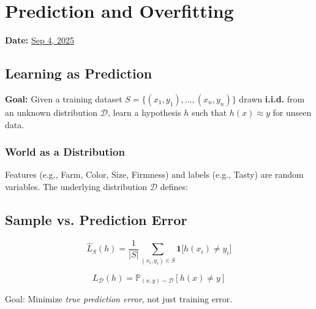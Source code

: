 \section{Prediction and Overfitting}
\textbf{Date:} \underline{Sep 4, 2025}

\subsection*{Learning as Prediction}

\textbf{Goal:}  
Given a training dataset $S = \{(x_1, y_1), \dots, (x_n, y_n)\}$ drawn \textbf{i.i.d.} from an unknown distribution $\mathcal{D}$,  
learn a hypothesis $h$ such that $h(x) \approx y$ for unseen data.

\subsubsection*{World as a Distribution}
Features (e.g., Farm, Color, Size, Firmness) and labels (e.g., Tasty) are random variables. The underlying distribution $\mathcal{D}$ defines:

\subsection*{Sample vs. Prediction Error}

\begin{definition}
\[
\hat{L}_S(h) = \frac{1}{|S|} \sum_{(x_i,y_i)\in S} \mathbf{1}\big[h(x_i) \neq y_i\big]
\]
\end{definition}

\begin{definition}
\[
L_{\mathcal{D}}(h) = \mathbb{P}_{(x,y)\sim\mathcal{D}}[h(x) \neq y]
\]
\end{definition}

Goal: Minimize \emph{true prediction error}, not just training error.

